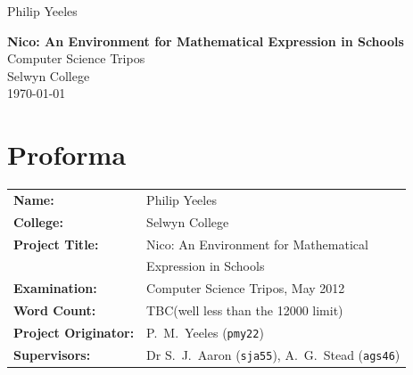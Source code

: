 \documentclass[12pt,twoside,notitlepage,xetex]{report}
\begin{document}
\nocite{*}




\pagestyle{empty}

\hfill{\Large Philip Yeeles}

\vspace*{60mm}
\begin{center}
\LARGE
{\bf \bigsf Nico: An Environment for Mathematical Expression in Schools}\\
\vspace*{5mm}
Computer Science Tripos\\
\vspace*{5mm}
Selwyn College\\
\vspace*{5mm}
\today %
\end{center}

\cleardoublepage


\setcounter{page}{1}
\pagestyle{plain}

\chapter*{Proforma}

{\large
\begin{tabular}{ll}
\bf Name:               & Philip Yeeles                                                   \\
\bf College:            & Selwyn College                                                  \\
\bf Project Title:      & Nico: An Environment for Mathematical\\
                        & Expression in Schools \\
\bf Examination:        & Computer Science Tripos, May 2012                               \\
\bf Word Count:         & TBC\footnotemark[1]
(well less than the 12000 limit) \\
\bf Project Originator: & P.~M.~Yeeles (\verb¬pmy22¬)                                    \\
\bf Supervisors:        & Dr S.~J.~Aaron (\verb¬sja55¬), A.~G.~Stead (\verb¬ags46¬)     \\
\end{tabular}
}
\end{document}
